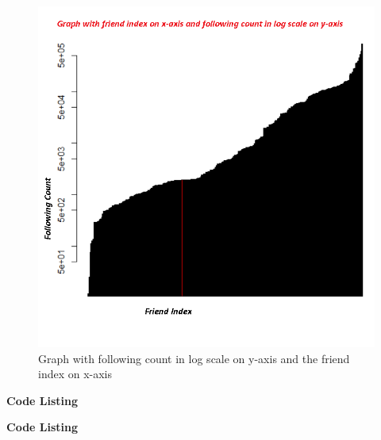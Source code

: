 \begin{itemize}
\begin{figure}[h!]
\begin{center}
\includegraphics[scale=0.55, keepaspectratio=true]{figures/following.PNG}
\caption{Graph with following count in log scale on y-axis and the friend index on x-axis }
\label{fig:q4fig3}
\end{center}
\end{figure}
\end{itemize}

\newpage
\textbf{Code Listing}


\textbf{Code Listing}

